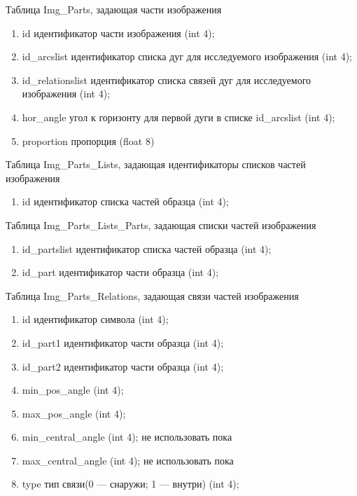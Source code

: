 \noindent 
Таблица Img\_Parts, задающая части изображения
\small
\begin{enumerate}
\item id				идентификатор части изображения (int 4);
\item id\_arcslist			идентификатор списка дуг для исследуемого изображения (int 4);
\item id\_relationslist		идентификатор списка связей дуг для исследуемого изображения (int 4);
\item hor\_angle			угол к горизонту для первой дуги в списке id\_arcslist (int 4);
\item proportion			пропорция (float 8)
\end{enumerate}
\normalsize


\noindent
 Таблица Img\_Parts\_Lists, задающая идентификаторы списков частей изображения
\small
\begin{enumerate}
\item id			идентификатор списка частей образца (int 4);
\end{enumerate}
\normalsize


\noindent 
Таблица Img\_Parts\_Lists\_Parts, задающая списки частей изображения
\small
\begin{enumerate}
\item id\_partslist 	идентификатор списка частей образца (int 4);
\item id\_part		идентификатор части образца (int 4);
\end{enumerate}
\normalsize


\noindent 
Таблица Img\_Parts\_Relations, задающая связи частей изображения
\small
\begin{enumerate}
\item id			               идентификатор символа (int 4);
\item id\_part1                		идентификатор части образца (int 4);
\item id\_part2                 		идентификатор части образца (int 4);
\item min\_pos\_angle		(int 4);
\item max\_pos\_angle		(int 4);
\item min\_central\_angle	(int 4); не использовать пока
\item max\_central\_angle	(int 4); не использовать пока
\item type				тип связи(0 — снаружи; 1 — внутри) (int 4);
\end{enumerate}
\normalsize


